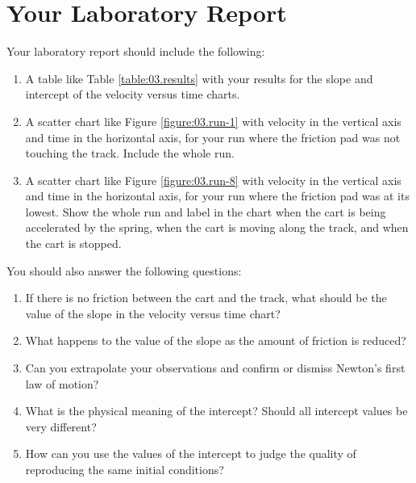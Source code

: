 \section{Your Laboratory Report}
Your laboratory report should include the following:
\begin{enumerate}
    \item A table like Table \ref{table:03.results} with your results for the slope and intercept of the velocity versus time charts.
    \item A scatter chart like Figure \ref{figure:03.run-1} with velocity in the vertical axis and time in the horizontal axis, for your run where the friction pad was not touching the track. Include the whole run.
    \item A scatter chart like Figure \ref{figure:03.run-8} with velocity in the vertical axis and time in the horizontal axis, for your run where the friction pad was at its lowest. Show the whole run and label in the chart when the cart is being accelerated by the spring, when the cart is moving along the track, and when the cart is stopped.
\end{enumerate}
You should also answer the following questions:
\begin{enumerate}
    \item If there is no friction between the cart and the track, what should be the value of the slope in the velocity versus time chart?
    \item What happens to the value of the slope as the amount of friction is reduced?
    \item Can you extrapolate your observations and confirm or dismiss Newton's first law of motion?
    \item What is the physical meaning of the intercept? Should all intercept values be very different?
    \item How can you use the values of the intercept to judge the quality of reproducing the same initial conditions?
\end{enumerate}
\newpage
